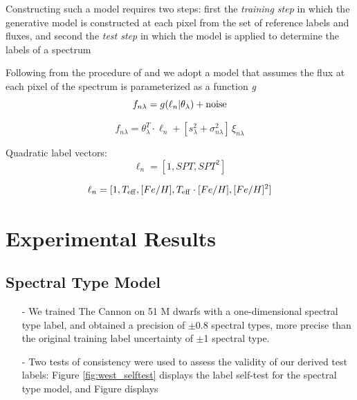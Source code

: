 \documentclass[modern]{aastex62}
\begin{document}
Constructing such a model requires two steps: first the \emph{training step} in which the generative model is constructed at each pixel from the set of reference labels and fluxes, and second the \emph{test step} in which the model is applied to determine the labels of a spectrum 


Following from the procedure of \citealt{Ness:2015} and \citealt{Ho:2017a} we adopt a model that assumes the flux at each pixel of the spectrum is parameterized as a function \textit{g} 
\begin{equation}
	f_{n\lambda} = g(\ell_n | \theta_{\lambda}) + {\rm noise}
\end{equation}

\begin{equation}
	f_{n\lambda} = \theta_{\lambda}^{T} \cdot \ell_{n} + [s_{\lambda}^{2} + \sigma_{n\lambda}^{2}] \,\xi_{n\lambda}
\end{equation}

Quadratic label vectors:
\begin{equation}
	\ell_{n} = [1, SPT, SPT^{2}]
\end{equation}

\begin{equation}
	\ell_{n} = [1, T_{\rm eff}, [Fe/H], T_{\rm eff} \cdot [Fe/H], [Fe/H]^{2}]
\end{equation}


\section{Experimental Results} \label{sec:results}

\subsection{Spectral Type Model}

\begin{enumerate}
\item[-] We trained The Cannon on 51 M dwarfs with a one-dimensional spectral type label, and obtained a precision of $\pm$0.8 spectral types, more precise than the original training label uncertainty of $\pm$1 spectral type.
\item[-] Two tests of consistency were used to assess the validity of our derived test labels: Figure \ref{fig:west_selftest} displays the label self-test for the spectral type model, and Figure  displays 
\end{enumerate}
\end{document}
